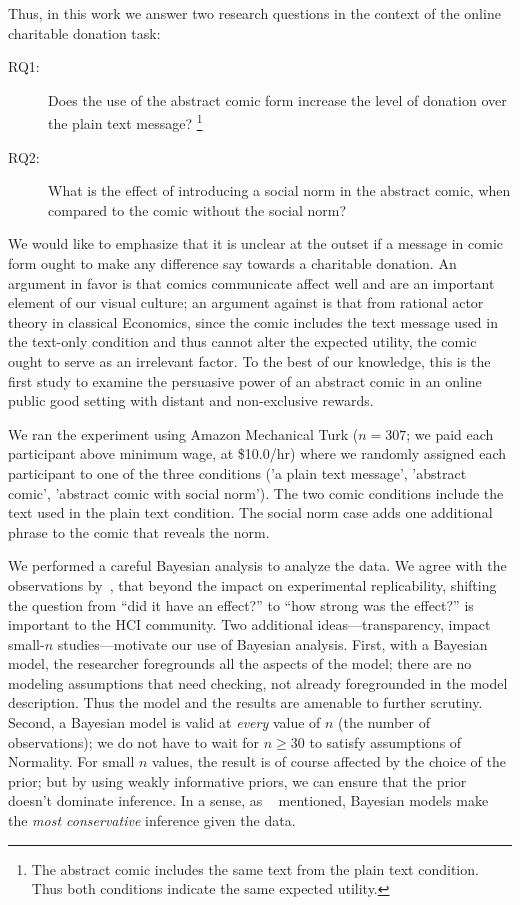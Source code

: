 Thus, in this work we answer two research questions in the context of the online charitable donation task:
\begin{description}
    \item[RQ1:] Does the use of the abstract comic form increase the level of donation over the plain text message? \footnote{The abstract comic includes the same text from the plain text condition. Thus both conditions indicate the same expected utility.}
    \item[RQ2:] What is the effect of introducing a social norm in the abstract comic, when compared to the comic without the social norm?
\end{description}

We would like to emphasize that it is unclear at the outset if a message in comic form ought to make any difference say towards a charitable donation. An argument in favor is that comics communicate affect well and are an important element of our visual culture; an argument against is that from rational actor theory in classical Economics, since the comic includes the text message used in the text-only condition and thus cannot alter the expected utility, the comic ought to serve as an irrelevant factor. To the best of our knowledge, this is the first study to examine the persuasive power of an abstract comic in an online public good setting with distant and non-exclusive rewards. 

We ran the experiment using Amazon Mechanical Turk ($n=307$; we paid each participant above minimum wage, at \$10.0/hr) where we randomly assigned each participant to one of the three conditions ('a plain text message', 'abstract comic', 'abstract comic with social norm'). The two comic conditions include the text used in the plain text condition. The social norm case adds one additional phrase to the comic that reveals the norm.

We performed a careful Bayesian analysis to analyze the data. We agree with the observations by~\textcite{Kay2016}, that beyond the impact on experimental replicability, shifting the question from ``did it have an effect?'' to ``how strong was the effect?'' is important to the HCI community. Two additional ideas---transparency, impact small-$n$ studies---motivate our use of Bayesian analysis. First, with a Bayesian model, the researcher foregrounds all the aspects of the model; there are no modeling assumptions that need checking, not already foregrounded in the model description. Thus the model and the results are amenable to further scrutiny. Second, a Bayesian model is valid at \textit{every} value of $n$ (the number of observations); we do not have to wait for $n\geq 30$ to satisfy assumptions of Normality. For small $n$ values, the result is of course affected by the choice of the prior; but by using weakly informative priors, we can ensure that the prior doesn't dominate inference. In a sense, as ~\textcite[][Chapter 9]{McElreath2015} mentioned, Bayesian models make the \textit{most conservative} inference given the data.

